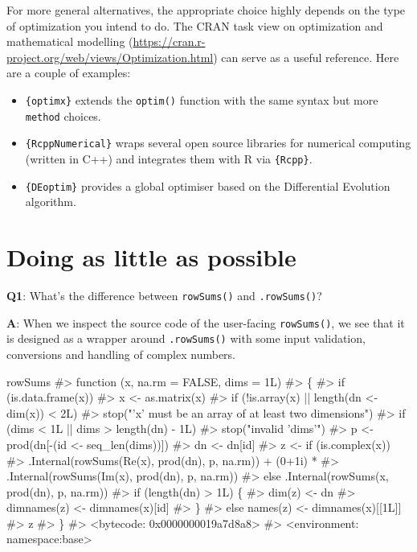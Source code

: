 \documentclass[
]{krantz}
\makeatletter
\newenvironment{Shaded}{\begin{snugshade}}{\end{snugshade}}
\newcommand{\CommentTok}[1]{\textcolor[rgb]{0.56,0.35,0.01}{\textit{#1}}}
\newcommand{\NormalTok}[1]{#1}
\providecommand{\tightlist}{%
  \setlength{\itemsep}{0pt}\setlength{\parskip}{0pt}}
\renewcommand{\href}[2]{#2 (\url{#1})}
\newenvironment{kframe}{%
\medskip{}
\setlength{\fboxsep}{.8em}
 \def\at@end@of@kframe{}%
 \ifinner\ifhmode%
  \def\at@end@of@kframe{\end{minipage}}%
  \begin{minipage}{\columnwidth}%
 \fi\fi%
 \def\FrameCommand##1{\hskip\@totalleftmargin \hskip-\fboxsep
 \colorbox{shadecolor}{##1}\hskip-\fboxsep
     \hskip-\linewidth \hskip-\@totalleftmargin \hskip\columnwidth}%
 \MakeFramed {\advance\hsize-\width
   \@totalleftmargin\z@ \linewidth\hsize
   \@setminipage}}%
 {\par\unskip\endMakeFramed%
 \at@end@of@kframe}
\renewenvironment{Shaded}{\begin{kframe}}{\end{kframe}}
\renewcommand{\CommentTok} [1]{\textcolor[rgb]{0.38,0.63,0.69}{{#1}}}
\renewcommand{\NormalTok}  [1]{{#1}}
\makeatother
\begin{document}
For more general alternatives, the appropriate choice highly depends on the type of optimization you intend to do. The \href{https://cran.r-project.org/web/views/Optimization.html}{CRAN task view on optimization and mathematical modelling} can serve as a useful reference. Here are a couple of examples:

\begin{itemize}
\tightlist
\item
  \texttt{\{optimx\}} extends the \texttt{optim()} function with the same syntax but more \texttt{method} choices.
\item
  \texttt{\{RcppNumerical\}} wraps several open source libraries for numerical computing (written in C++) and integrates them with R via \texttt{\{Rcpp\}}.
\item
  \texttt{\{DEoptim\}} provides a global optimiser based on the Differential Evolution algorithm.
\end{itemize}

\hypertarget{doing-as-little-as-possible}{%
\section{Doing as little as possible}\label{doing-as-little-as-possible}}

\textbf{{Q1}}: What's the difference between \texttt{rowSums()} and \texttt{.rowSums()}?

\textbf{{A}}: When we inspect the source code of the user-facing \texttt{rowSums()}, we see that it is designed as a wrapper around \texttt{.rowSums()} with some input validation, conversions and handling of complex numbers.

\begin{Shaded}
\begin{Highlighting}[]
\NormalTok{rowSums}
\CommentTok{#> function (x, na.rm = FALSE, dims = 1L) }
\CommentTok{#> \{}
\CommentTok{#>     if (is.data.frame(x)) }
\CommentTok{#>         x <- as.matrix(x)}
\CommentTok{#>     if (!is.array(x) || length(dn <- dim(x)) < 2L) }
\CommentTok{#>         stop("'x' must be an array of at least two dimensions")}
\CommentTok{#>     if (dims < 1L || dims > length(dn) - 1L) }
\CommentTok{#>         stop("invalid 'dims'")}
\CommentTok{#>     p <- prod(dn[-(id <- seq_len(dims))])}
\CommentTok{#>     dn <- dn[id]}
\CommentTok{#>     z <- if (is.complex(x)) }
\CommentTok{#>         .Internal(rowSums(Re(x), prod(dn), p, na.rm)) + (0+1i) * }
\CommentTok{#>             .Internal(rowSums(Im(x), prod(dn), p, na.rm))}
\CommentTok{#>     else .Internal(rowSums(x, prod(dn), p, na.rm))}
\CommentTok{#>     if (length(dn) > 1L) \{}
\CommentTok{#>         dim(z) <- dn}
\CommentTok{#>         dimnames(z) <- dimnames(x)[id]}
\CommentTok{#>     \}}
\CommentTok{#>     else names(z) <- dimnames(x)[[1L]]}
\CommentTok{#>     z}
\CommentTok{#> \}}
\CommentTok{#> <bytecode: 0x0000000019a7d8a8>}
\CommentTok{#> <environment: namespace:base>}
\end{Highlighting}
\end{Shaded}
\end{document}
